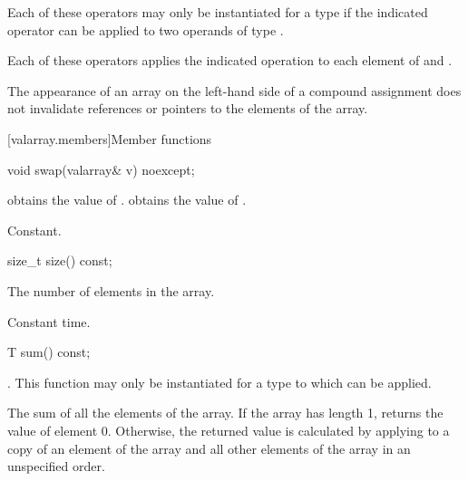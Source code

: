\begin{itemdescr}
\pnum
\requires
Each of these operators may only be instantiated for a type 
if the indicated operator can be applied to two operands of type .

\pnum
\effects
Each of these operators applies the indicated operation to each element
of  and .

\pnum
\returns
{}

\pnum
\remarks
The appearance of an array on the left-hand side of a compound assignment
does not
invalidate references or pointers to the elements of the array.
\end{itemdescr}

[valarray.members]{Member functions}

%
\begin{itemdecl}
void swap(valarray& v) noexcept;
\end{itemdecl}

\begin{itemdescr}
\pnum
\effects {} obtains the value of
.  obtains the value of .

\pnum
\complexity Constant.
\end{itemdescr}

%
\begin{itemdecl}
size_t size() const;
\end{itemdecl}

\begin{itemdescr}
\pnum
\returns The number of elements in the array.

\pnum
\complexity Constant time.
\end{itemdescr}

%
\begin{itemdecl}
T sum() const;
\end{itemdecl}

\begin{itemdescr}
\pnum
\requires
{}.
This function may only be instantiated for a type  to which
can be applied.

\pnum
\returns
The sum of all the elements of the array.
If the array has length 1, returns the value of element 0.
Otherwise, the returned value is calculated by applying
to a copy of an element of the array and
all other elements of the array in an unspecified order.%
\end{itemdescr}

